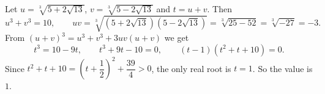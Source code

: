 Let $u=\sqrt[3]{5+2\sqrt{13}}$, $v=\sqrt[3]{5-2\sqrt{13}}$ and $t=u+v$. Then
\[
u^3+v^3=10,\qquad uv=\sqrt[3]{(5+2\sqrt{13})(5-2\sqrt{13})}=\sqrt[3]{25-52}=\sqrt[3]{-27}=-3 .
\]
From $(u+v)^3=u^3+v^3+3uv(u+v)$ we get
\[
t^3=10-9t,\qquad t^3+9t-10=0,\qquad (t-1)(t^2+t+10)=0 .
\]
Since $t^2+t+10=\left(t+\dfrac{1}{2}\right)^2+\dfrac{39}{4}>0$, the only real root is $t=1$. So the value is $\boxed{1}$.
